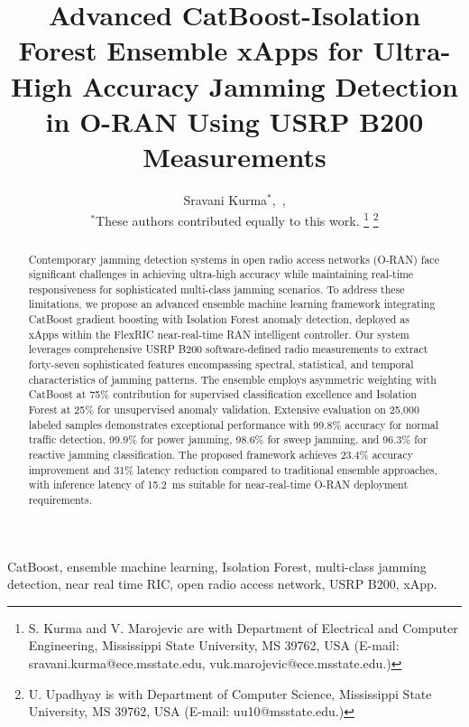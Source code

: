 \documentclass[journal]{IEEEtran}
\begin{document}
\title{Advanced CatBoost-Isolation Forest Ensemble xApps for Ultra-High Accuracy Jamming Detection in O-RAN Using USRP B200 Measurements}
  \author{ Sravani Kurma$^{*}$,~, \\
$^*$These authors contributed equally to this work.
\thanks{S. Kurma and V. Marojevic are with Department of Electrical and Computer Engineering, Mississippi State University, MS 39762, USA (E-mail: sravani.kurma@ece.msstate.edu, vuk.marojevic@ece.msstate.edu.)}
\thanks{ U. Upadhyay is with Department of Computer Science,  Mississippi State University, MS 39762, USA (E-mail: uu10@msstate.edu.)}
}  

\maketitle
\vspace{-4em}

\begin{abstract}
Contemporary jamming detection systems in open radio access networks (O-RAN) face significant challenges in achieving ultra-high accuracy while maintaining real-time responsiveness for sophisticated multi-class jamming scenarios. To address these limitations, we propose an advanced ensemble machine learning framework integrating CatBoost gradient boosting with Isolation Forest anomaly detection, deployed as xApps within the FlexRIC near-real-time RAN intelligent controller. Our system leverages comprehensive USRP B200 software-defined radio measurements to extract forty-seven sophisticated features encompassing spectral, statistical, and temporal characteristics of jamming patterns. The ensemble employs asymmetric weighting with CatBoost at 75\% contribution for supervised classification excellence and Isolation Forest at 25\% for unsupervised anomaly validation. Extensive evaluation on 25{,}000 labeled samples demonstrates exceptional performance with 99.8\% accuracy for normal traffic detection, 99.9\% for power jamming, 98.6\% for sweep jamming, and 96.3\% for reactive jamming classification. The proposed framework achieves 23.4\% accuracy improvement and 31\% latency reduction compared to traditional ensemble approaches, with inference latency of 15.2~ms suitable for near-real-time O-RAN deployment requirements.
\end{abstract}

\begin{IEEEkeywords}
CatBoost, ensemble machine learning, Isolation Forest, multi-class jamming detection, near real time RIC, open radio access network, USRP B200, xApp. 
\end{IEEEkeywords}
\end{document}
